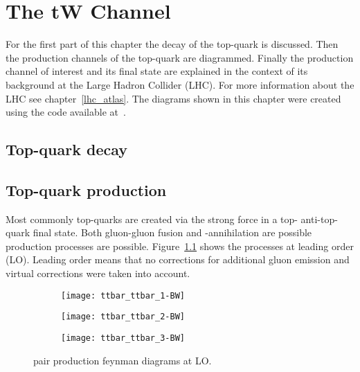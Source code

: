 \chapter{The tW Channel}
\label{chp:tw}

For the first part of this chapter the decay of the top-quark is discussed. Then the production channels of the top-quark are diagrammed. Finally the production channel of interest and its final state are explained in the context of its background at the Large Hadron Collider (LHC). For more information about the LHC see chapter~\ref{lhc_atlas}.
The diagrams shown in this chapter were created using the code available at~\cite{feyn_repo}.

\section{Top-quark decay}


\section{Top-quark production}

Most commonly top-quarks are created via the strong force in a top- anti-top-quark final state. Both gluon-gluon fusion and \Pquark\APquark-annihilation are possible production processes are possible. Figure~\ref{fig:ttpairLO} shows the processes at leading order (LO). Leading order means that no corrections for additional gluon emission and virtual corrections were taken into account.

\begin{figure}[htbp]
  \begin{subfigure}[b]{0.3\textwidth}
  	\centering
    \texttt{[image: ttbar\_ttbar\_1-BW]}
  \end{subfigure}
  \quad
  \begin{subfigure}[b]{0.3\textwidth}
  	\centering
    \texttt{[image: ttbar\_ttbar\_2-BW]}
  \end{subfigure}
  \quad
  \begin{subfigure}[b]{0.3\textwidth}
  	\centering
    \texttt{[image: ttbar\_ttbar\_3-BW]}
  \end{subfigure} 
  \caption{\ttbar pair production feynman diagrams at LO.}
  \label{fig:ttpairLO}
\end{figure}

